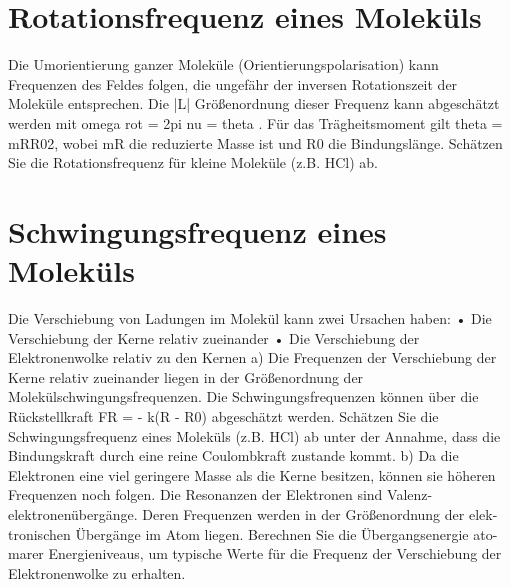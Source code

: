 \section{Rotationsfrequenz eines Moleküls}

Die Umorientierung ganzer Moleküle (Orientierungspolarisation) kann Frequenzen des
Feldes folgen, die ungefähr der inversen Rotationszeit der Moleküle entsprechen. Die
|L| Größenordnung dieser Frequenz kann abgeschätzt werden mit omega rot = 2pi nu = theta .
Für das Trägheitsmoment gilt theta = mRR02, wobei mR die reduzierte Masse ist und R0 die Bindungslänge.
Schätzen Sie die Rotationsfrequenz für kleine Moleküle (z.B. HCl) ab.


\section{Schwingungsfrequenz eines Moleküls}
Die Verschiebung von Ladungen im Molekül kann zwei Ursachen haben:
• Die Verschiebung der Kerne relativ zueinander
• Die Verschiebung der Elektronenwolke relativ zu den Kernen
a) Die Frequenzen der Verschiebung der Kerne relativ zueinander liegen in der Größenordnung der Molekülschwingungsfrequenzen. Die Schwingungsfrequenzen können über die Rückstellkraft FR = - k(R - R0) abgeschätzt werden. Schätzen Sie die Schwingungsfrequenz eines Moleküls (z.B. HCl) ab unter der Annahme, dass die Bindungskraft durch eine reine Coulombkraft zustande kommt.
b) Da die Elektronen eine viel geringere Masse als die Kerne besitzen, können sie höheren Frequenzen noch folgen. Die Resonanzen der Elektronen sind Valenz- elektronenübergänge. Deren Frequenzen werden in der Größenordnung der elek- tronischen Übergänge im Atom liegen. Berechnen Sie die Übergangsenergie ato- marer Energieniveaus, um typische Werte für die Frequenz der Verschiebung der Elektronenwolke zu erhalten.